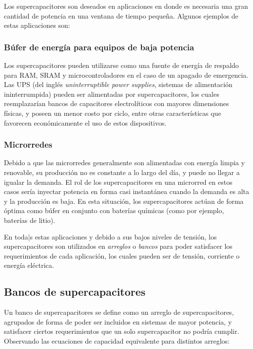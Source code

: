 Los supercapacitores son deseados en aplicaciones en donde es necesaria una gran cantidad de potencia en una ventana de tiempo pequeña. Algunos ejemplos de estas aplicaciones son:

\subsubsection{Búfer de energía para equipos de baja potencia}

Los supercapacitores pueden utilizarse como una fuente de energía de respaldo para RAM, SRAM y microcontroladores en el caso de un apagado de emergencia. Las UPS (del inglés \emph{uninterruptible power supplies}, sistemas de alimentación ininterrumpida) pueden ser alimentadas por supercapacitores, los cuales reemplazarían bancos de capacitores electrolíticos con mayores dimensiones físicas, y poseen un menor costo por ciclo, entre otras características que favorecen económicamente el uso de estos dispositivos.

\subsubsection{Microrredes}

Debido a que las microrredes generalmente son alimentadas con energía limpia y renovable, su producción no es constante a lo largo del día, y puede no llegar a igualar la demanda. El rol de los supercapacitores en una microrred en estos casos sería inyectar potencia en forma casi instantánea cuando la demanda es alta y la producción es baja. En esta situación, los supercapacitores actúan de forma óptima como búfer en conjunto con baterías químicas (como por ejemplo, baterías de litio).

En toda|s estas aplicaciones y debido a sus bajos niveles de tensión, los supercapacitores son utilizados en \emph{arreglos} o \emph{bancos} para poder satisfacer los requerimientos de cada aplicación, los cuales pueden ser de tensión, corriente o energía eléctrica.

\subsection{Bancos de supercapacitores}

Un banco de supercapacitores se define como un arreglo de supercapacitores, agrupados de forma de poder ser incluidos en sistemas de mayor potencia, y satisfacer ciertos requerimientos que un solo supercapacitor no podría cumplir. Observando las ecuaciones de capacidad equivalente para distintos arreglos:

